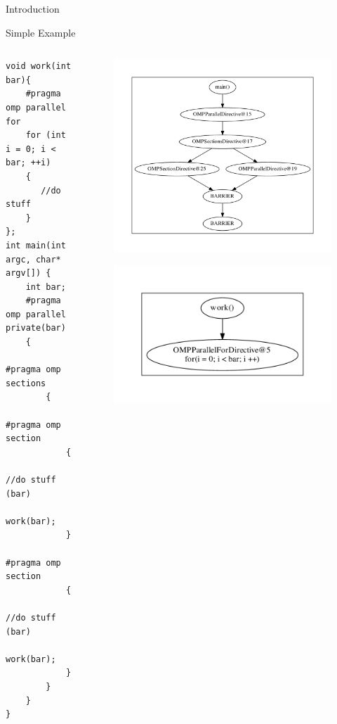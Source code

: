 \documentclass[xcolor=dvipsnames]{beamer}
\begin{document}
\begin{section}{Introduction}
\begin{frame}[fragile]{\hskip 0.3cm Simple Example}
\begin{columns}
\begin{column}{5cm}
\begin{lstlisting}[language=CCC]
void work(int bar){
    #pragma omp parallel for
    for (int i = 0; i < bar; ++i)
    {
       //do stuff
    }  
};
int main(int argc, char* argv[]) {
    int bar;
    #pragma omp parallel private(bar)
    {
        #pragma omp sections
        {
            #pragma omp section
            {   
                //do stuff (bar)
                work(bar);
            }
            #pragma omp section
            {
                //do stuff (bar)
                work(bar);
            }
        }
    }
}
\end{lstlisting}

\end{column}

\begin{column}{6.5cm}
\vskip -1cm
\begin{figure}

\includegraphics[scale=0.3]{main.pdf}
\end{figure}
\vskip -1.5cm
\begin{figure}
\includegraphics[scale=0.3]{work.pdf}
\end{figure}


\end{column}
\end{columns}
\end{frame}
\end{section}
\end{document}
